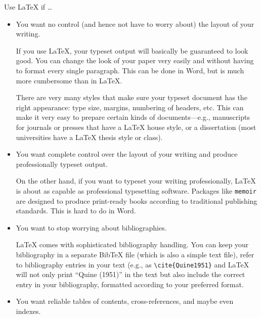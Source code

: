 \begin{frame}[fragile]{Use \LaTeX{} if \dots}

\begin{itemize}
\item You want no control (and hence not have to worry about) the
  layout of your writing.

\begin{articleonly}
If you use \LaTeX{}, your typeset output will basically be guaranteed
to look good.  You can change the look of your paper very easily and
without having to format every single paragraph.  This can be done in
Word, but is much more cumbersome than in \LaTeX.

There are very many styles that make sure your typeset document has
the right appearance: type size, margins, numbering of headers,
etc. This can make it very easy to prepare certain kinds of
documents---e.g., manuscripts for journals or presses that have
a \LaTeX{} house style, or a dissertation (most universities have
a \LaTeX{} thesis style or class).
\end{articleonly}

\item You want complete control over the layout of your writing and
  produce professionally typeset output.

\begin{articleonly}
On the other hand, if you want to typeset your writing professionally,
\LaTeX{} is about as capable as professional typesetting
software. Packages like \texttt{memoir} are designed to produce
print-ready books according to traditional publishing standards. This
is hard to do in Word.
\end{articleonly}

\item You want to stop worrying about bibliographies.

\begin{articleonly}
\LaTeX{} comes with sophisticated bibliography handling. You can keep
your bibliography in a separate Bib\TeX{} file (which is also a simple
text file), refer to bibliography entries in your text (e.g., as
\verb+\cite{Quine1951}+ and \LaTeX{} will not only print ``Quine
(1951)'' in the text but also include the correct entry in your
bibliography, formatted according to your preferred format.
\end{articleonly}

\item You want reliable tables of contents, cross-references, and maybe
  even indexes.


\end{itemize}
\end{frame}
